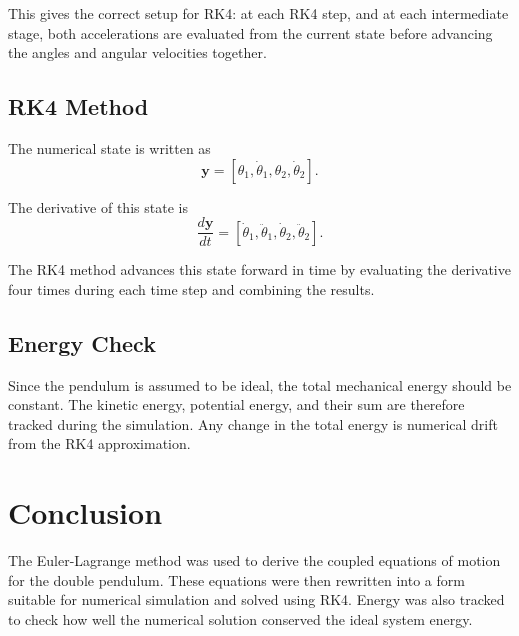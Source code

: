 \documentclass[11pt,a4paper,fleqn]{article}
\begin{document}
This gives the correct setup for RK4: at each RK4 step, and at each intermediate
stage, both accelerations are evaluated from the current state before advancing
the angles and angular velocities together.

\subsection{RK4 Method}

The numerical state is written as
\[
    \mathbf{y} =
    [\theta_1,\dot{\theta}_1,\theta_2,\dot{\theta}_2].
\]

The derivative of this state is
\[
    \frac{d\mathbf{y}}{dt} =
    [\dot{\theta}_1,\ddot{\theta}_1,\dot{\theta}_2,\ddot{\theta}_2].
\]

The RK4 method advances this state forward in time by evaluating the derivative
four times during each time step and combining the results.

\subsection{Energy Check}

Since the pendulum is assumed to be ideal, the total mechanical energy should be
constant. The kinetic energy, potential energy, and their sum are therefore
tracked during the simulation. Any change in the total energy is numerical
drift from the RK4 approximation.

\section{Conclusion}

The Euler-Lagrange method was used to derive the coupled equations of motion for
the double pendulum. These equations were then rewritten into a form suitable
for numerical simulation and solved using RK4. Energy was also tracked to check
how well the numerical solution conserved the ideal system energy.
\end{document}
